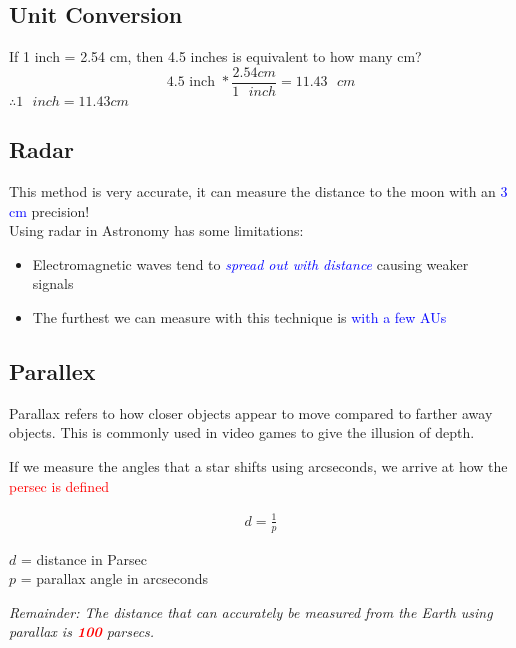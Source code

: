 \subsection{Unit Conversion}
\begin{example}
    If 1 inch = 2.54 cm, then 4.5 inches is equivalent to how many cm? \\
    \[
    4.5 \text{ inch } * \frac{2.54cm}{1\text{ }inch} = 11.43 \text{ }cm
    \]
    $\therefore 1 \text{ } inch = 11.43 cm$
\end{example}

\subsection{Radar}
This method is very accurate, it can measure the distance to the moon with an \textcolor{blue}{3 cm} precision!\\

Using radar in Astronomy has some limitations:
\begin{itemize}
    \item Electromagnetic waves tend to \textcolor{blue}{\textit{spread out with distance}} causing weaker signals
    \item The furthest we can measure with this technique is \textcolor{blue}{with a few AUs}
\end{itemize}

\subsection{Parallex}
Parallax refers to how closer objects appear to move compared to farther away objects. This is commonly used in video games
to give the illusion of depth.\\


If we measure the angles that a star shifts using arcseconds, we arrive at how the \textcolor{red}{persec is defined}

\begin{gather}
    d = \frac{1}{p}
\end{gather}

\begin{center}
    $d$ = distance in Parsec\\
    $p$ = parallax angle in arcseconds
\end{center}

\textit{Remainder: The distance that can accurately be measured from the Earth using parallax is \textbf{\textcolor{red}{100}} parsecs.}

